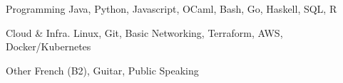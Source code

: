 


\begin{cvskills}


\cvskill
{Programming} %
{Java, Python, Javascript, OCaml, Bash, Go, Haskell, SQL, R} %


\cvskill
{Cloud \& Infra.} %
{Linux, Git, Basic Networking, Terraform, AWS, Docker/Kubernetes} %


\cvskill
{Other} %
{French (B2), Guitar, Public Speaking} %


\end{cvskills}
